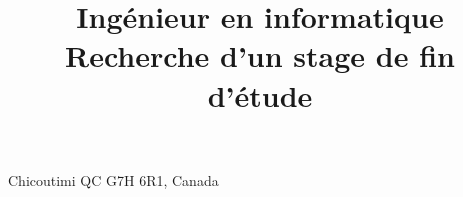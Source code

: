 \title{
    Ingénieur en informatique \newline
    \small Recherche d'un stage de fin d'étude
}
\address{639 rue Émile-Girardin}{Chicoutimi QC G7H 6R1, Canada}
